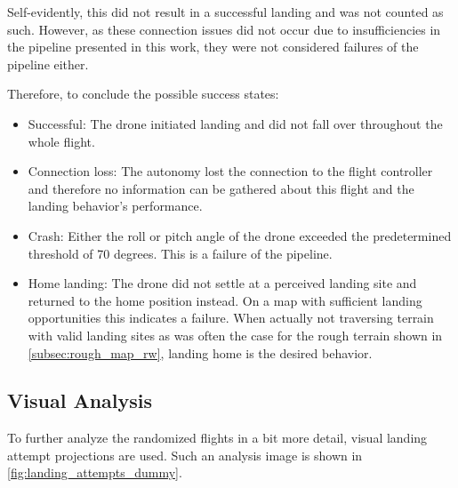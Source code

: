 Self-evidently, this did not result in a successful landing and was not counted as such. However, as these connection issues did not occur due to insufficiencies in the pipeline presented in this work, they were not considered failures of the pipeline either. 

Therefore, to conclude the possible success states:

\begin{itemize}
    \item Successful: The drone initiated landing and did not fall over throughout the whole flight.
    \item Connection loss: The autonomy lost the connection to the flight controller and therefore no information can be gathered about this flight and the landing behavior's performance.
    \item Crash: Either the roll or pitch angle of the drone exceeded the predetermined threshold of 70 degrees. This is a failure of the pipeline.
    \item Home landing: The drone did not settle at a perceived landing site and returned to the home position instead. On a map with sufficient landing opportunities this indicates a failure. When actually not traversing terrain with valid landing sites as was often the case for the rough terrain shown in \cref{subsec:rough_map_rw}, landing home is the desired behavior.
\end{itemize}
\clearpage


\subsection{Visual Analysis}
To further analyze the randomized flights in a bit more detail, visual landing attempt projections are used. Such an analysis image is shown in \cref{fig:landing_attempts_dummy}.


